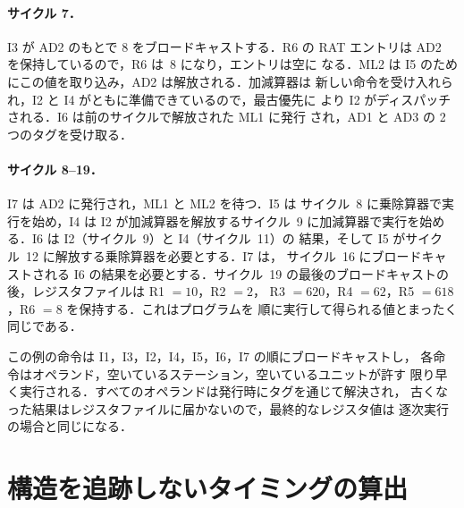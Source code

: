 \documentclass[../main.tex]{subfiles}
\begin{document}
\paragraph{サイクル 7．}I3 が AD2 のもとで 8 をブロードキャストする．R6 の
RAT エントリは AD2 を保持しているので，R6 は~8 になり，エントリは空に
なる．ML2 は I5 のためにこの値を取り込み，AD2 は解放される．加減算器は
新しい命令を受け入れられ，I2 と I4 がともに準備できているので，最古優先に
より I2 がディスパッチされる．I6 は前のサイクルで解放された ML1 に発行
され，AD1 と AD3 の 2つのタグを受け取る．

\paragraph{サイクル 8--19．}I7 は AD2 に発行され，ML1 と ML2 を待つ．I5 は
サイクル~8 に乗除算器で実行を始め，I4 は I2 が加減算器を解放するサイクル~9
に加減算器で実行を始める．I6 は I2（サイクル~9）と I4（サイクル~11）の
結果，そして I5 がサイクル~12 に解放する乗除算器を必要とする．I7 は，
サイクル~16 にブロードキャストされる I6 の結果を必要とする．サイクル~19
の最後のブロードキャストの後，レジスタファイルは R1 $=10$，R2 $=2$，
R3 $=620$，R4 $=62$，R5 $=618$，R6 $=8$ を保持する．これはプログラムを
順に実行して得られる値とまったく同じである．

\begin{keypoint}
  この例の命令は I1，I3，I2，I4，I5，I6，I7 の順にブロードキャストし，
  各命令はオペランド，空いているステーション，空いているユニットが許す
  限り早く実行される．すべてのオペランドは発行時にタグを通じて解決され，
  古くなった結果はレジスタファイルに届かないので，最終的なレジスタ値は
  逐次実行の場合と同じになる．
\end{keypoint}

\section{構造を追跡しないタイミングの算出}
\label{sec:l07-timing}
\end{document}
